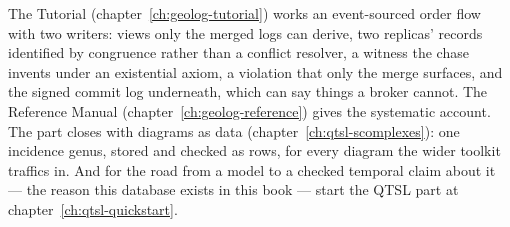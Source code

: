 The Tutorial (chapter~\ref{ch:geolog-tutorial}) works an event-sourced
order flow with two writers: views only the merged logs can derive,
two replicas' records identified by congruence rather than a conflict
resolver, a witness the chase invents under an existential axiom, a
violation that only the merge surfaces, and the signed commit log
underneath, which can say things a broker cannot. The Reference Manual
(chapter~\ref{ch:geolog-reference}) gives the systematic account. The
part closes with diagrams as data (chapter~\ref{ch:qtsl-scomplexes}):
one incidence genus, stored and checked as rows, for every diagram
the wider toolkit traffics in. And
for the road from a model to a checked temporal claim about it ---
the reason this database exists in this book --- start the QTSL part
at chapter~\ref{ch:qtsl-quickstart}.

